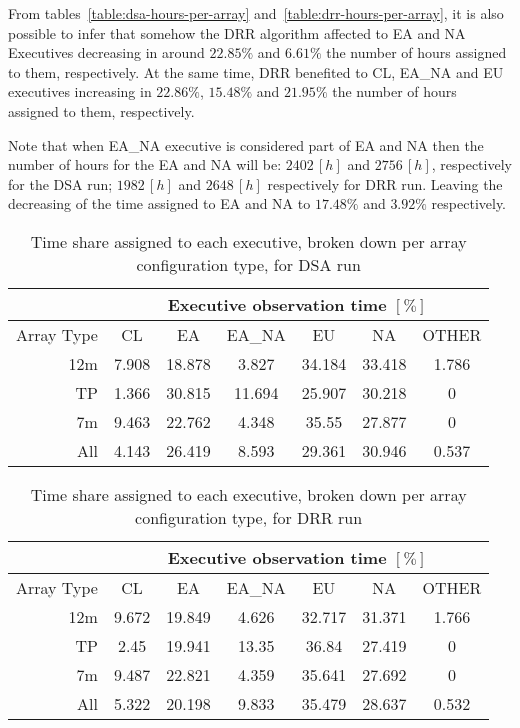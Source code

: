 From tables~\ref{table:dsa-hours-per-array} and~\ref{table:drr-hours-per-array}, it is also possible to infer that somehow the DRR algorithm affected to EA and NA Executives decreasing in around $22.85\%$ and $6.61\%$ the number of hours assigned to them, respectively. At the same time, DRR benefited to CL, EA\_NA and EU executives increasing in $22.86\%$, $15.48\%$ and $21.95\%$ the number of hours assigned to them, respectively.

Note that when EA\_NA executive is considered part of EA and NA then the number of hours for the EA and NA will be: $2402\,[h]$ and $2756\,[h]$, respectively for the DSA run; $1982\,[h]$ and $2648\,[h]$ respectively for DRR run. Leaving the decreasing of the time assigned to EA and NA to $17.48\%$ and $3.92\%$ respectively.  

\begin{table}[t]
\centering
\begin{tabular}{c|c|c|c|c|c|c|} 
\cline{2-7}
 & \multicolumn{6}{c|}{Executive observation time $[\%]$} \\ \hline
\multicolumn{1}{|r|}{Array Type} & CL	& EA & EA\_NA &	EU & NA & OTHER \\ \hline
\multicolumn{1}{|r|}{12m} & 7.908 & 18.878 & 3.827 & 34.184 & 33.418 & 1.786 \\ \hline
\multicolumn{1}{|r|}{TP} & 1.366 & 30.815 & 11.694 & 25.907 & 30.218 & 0 \\ \hline
\multicolumn{1}{|r|}{7m} & 9.463 & 22.762 & 4.348 & 35.55 & 27.877 & 0 \\ \hline
\multicolumn{1}{|r|}{All} & 4.143 & 26.419 & 8.593 & 29.361 & 30.946 & 0.537 \\ \hline
\end{tabular}
\caption{Time share assigned to each executive, broken down per array configuration type, for DSA run}
\label{table:dsa-percentage-per-array}
\end{table}

\begin{table}[t]
\centering
\begin{tabular}{c|c|c|c|c|c|c|} 
\cline{2-7}
 & \multicolumn{6}{c|}{Executive observation time $[\%]$} \\ \hline
\multicolumn{1}{|r|}{Array Type} & CL	& EA & EA\_NA &	EU & NA & OTHER \\ \hline
\multicolumn{1}{|r|}{12m} & 9.672 & 19.849 & 4.626 & 32.717 & 31.371 & 1.766 \\ \hline
\multicolumn{1}{|r|}{TP} & 2.45 & 19.941 & 13.35 & 36.84 & 27.419 & 0 \\ \hline
\multicolumn{1}{|r|}{7m} & 9.487 & 22.821 & 4.359 & 35.641 & 27.692 & 0 \\ \hline
\multicolumn{1}{|r|}{All} & 5.322 & 20.198 & 9.833 & 35.479 & 28.637 & 0.532 \\ \hline
\end{tabular}
\caption{Time share assigned to each executive, broken down per array configuration type, for DRR run}
\label{table:drr-percentage-per-array}
\end{table}

